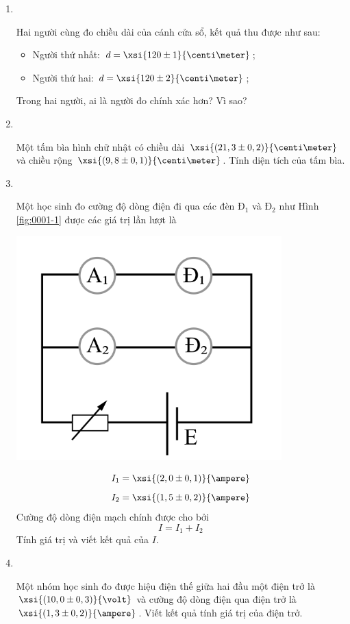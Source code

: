 \begin{enumerate}[label=\bfseries Bài \arabic*:]
	\item {}\\
	{Hai người cùng đo chiều dài của cánh cửa sổ, kết quả thu được như sau:
		\begin{itemize}
			\item Người thứ nhất: $d=\xsi{120\pm1}{\centi\meter}$;
			\item Người thứ hai: $d=\xsi{120\pm 2}{\centi\meter}$;
		\end{itemize}
	Trong hai người, ai là người đo chính xác hơn? Vì sao?
}
	
	\item {}\\
	{Một tấm bìa hình chữ nhật có chiều dài $\xsi{\left(21,3\pm0,2\right)}{\centi\meter}$ và chiều rộng $\xsi{\left(9,8\pm0,1\right)}{\centi\meter}$. Tính diện tích của tấm bìa.
	
}

\item {}\\
{Một học sinh đo cường độ dòng điện đi qua các đèn $\text{Đ}_1$ và $\text{Đ}_2$ như Hình \ref{fig:0001-1} được các giá trị lần lượt là 
	\begin{center}
		\includegraphics[width=0.3\linewidth]{../figs/VN10-2023-PH-TP0001-1}
		\label{fig:0001-1}
	\end{center}
	$$I_1=\xsi{\left(2,0\pm0,1\right)}{\ampere}$$
	$$I_2=\xsi{\left(1,5\pm0,2\right)}{\ampere}$$
	Cường độ dòng điện mạch chính được cho bởi
	$$I=I_1+I_2$$
	Tính giá trị và viết kết quả của $I$.


}

\item {}\\
{Một nhóm học sinh đo được hiệu điện thế giữa hai đầu một điện trở là $\xsi{\left(10,0\pm0,3\right)}{\volt}$ và cường độ dòng điện qua điện trở là $\xsi{\left(1,3\pm0,2\right)}{\ampere}$. Viết kết quả tính giá trị của điện trở.

}
\end{enumerate}
